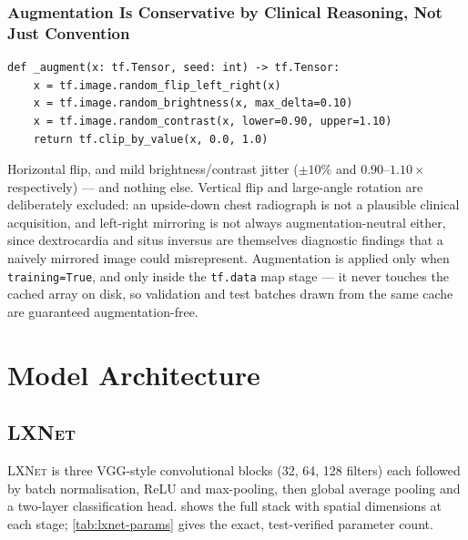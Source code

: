 \documentclass[11pt,a4paper,oneside]{report}
\newcommand{\LXNet}{\textsc{LXNet}}
\newcommand{\code}[1]{\texttt{\small #1}}
\begin{document}
\subsection{Augmentation Is Conservative by Clinical Reasoning, Not Just Convention}

\begin{lstlisting}[caption={The full augmentation policy
(\texttt{lxnet/pipeline.py}).}, label=lst:augment]
def _augment(x: tf.Tensor, seed: int) -> tf.Tensor:
    x = tf.image.random_flip_left_right(x)
    x = tf.image.random_brightness(x, max_delta=0.10)
    x = tf.image.random_contrast(x, lower=0.90, upper=1.10)
    return tf.clip_by_value(x, 0.0, 1.0)
\end{lstlisting}

Horizontal flip, and mild brightness/contrast jitter ($\pm10\%$ and
$0.90$--$1.10\times$ respectively) --- and nothing else. Vertical flip and
large-angle rotation are deliberately excluded: an upside-down chest
radiograph is not a plausible clinical acquisition, and left-right mirroring
is not always augmentation-neutral either, since dextrocardia and situs
inversus are themselves diagnostic findings that a naively mirrored image
could misrepresent. Augmentation is applied only when \code{training=True},
and only inside the \code{tf.data} map stage --- it never touches the cached
array on disk, so validation and test batches drawn from the same cache are
guaranteed augmentation-free.

\chapter{Model Architecture}
\label{ch:architecture-model}

\section{\LXNet{}}

\LXNet{} is three VGG-style convolutional blocks (32, 64, 128 filters) each
followed by batch normalisation, ReLU and max-pooling, then global average
pooling and a two-layer classification head.  shows the
full stack with spatial dimensions at each stage; \cref{tab:lxnet-params}
gives the exact, test-verified parameter count.
\end{document}
